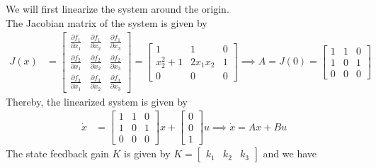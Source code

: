 We will first linearize the system around the origin.\\
The Jacobian matrix of the system is given by
\begin{align*}
    J(x)
     & =
    \begin{bmatrix}
        \frac{\partial f_{1}}{\partial x_{1}} & \frac{\partial f_{1}}{\partial x_{2}} & \frac{\partial f_{1}}{\partial x_{3}} \\
        \frac{\partial f_{2}}{\partial x_{1}} & \frac{\partial f_{2}}{\partial x_{2}} & \frac{\partial f_{2}}{\partial x_{3}} \\
        \frac{\partial f_{3}}{\partial x_{1}} & \frac{\partial f_{3}}{\partial x_{2}} & \frac{\partial f_{3}}{\partial x_{3}}
    \end{bmatrix}
    =
    \begin{bmatrix}
        1       & 1       & 0 \\
        x_2^2+1 & 2x_1x_2 & 1 \\
        0       & 0       & 0
    \end{bmatrix}
    \implies
    A
    =
    J(0)
    =
    \begin{bmatrix}
        1 & 1 & 0 \\
        1 & 0 & 1 \\
        0 & 0 & 0
    \end{bmatrix}
\end{align*}
Thereby, the linearized system is given by
\begin{align*}
    \dot{x}
     & =
    \begin{bmatrix}
        1 & 1 & 0 \\
        1 & 0 & 1 \\
        0 & 0 & 0
    \end{bmatrix}
    x
    +
    \begin{bmatrix}
        0 \\
        0 \\
        1
    \end{bmatrix}
    u
    \implies
    \dot x = Ax + Bu
\end{align*}
The state feedback gain \( K \) is given by
\(
K =
\begin{bmatrix}
    k_{1} & k_{2} & k_{3}
\end{bmatrix}
\)
and we have
